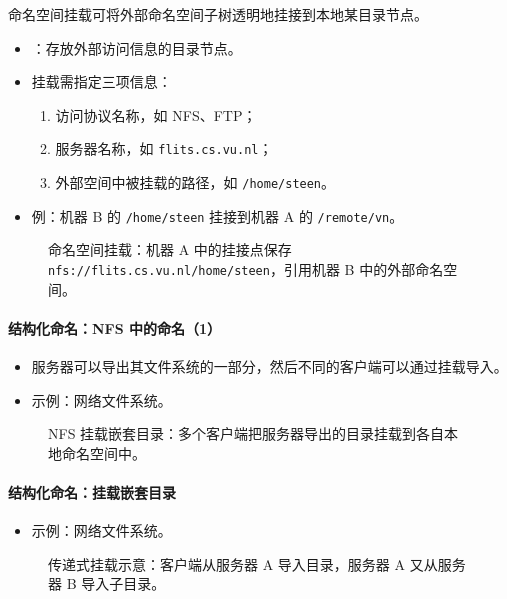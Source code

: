 命名空间挂载可将外部命名空间子树透明地挂接到本地某目录节点。

\begin{itemize}
  \item {}：存放外部访问信息的目录节点。
  \item 挂载需指定三项信息：
  \begin{enumerate}
    \item 访问协议名称，如 NFS、FTP；
    \item 服务器名称，如 \texttt{flits.cs.vu.nl}；
    \item 外部空间中被挂载的路径，如 \texttt{/home/steen}。
  \end{enumerate}
  \item 例：机器 B 的 \texttt{/home/steen} 挂接到机器 A 的 \texttt{/remote/vn}。
\end{itemize}

\begin{figure}[H]
  \centering
  \caption{命名空间挂载：机器 A 中的挂接点保存 \texttt{nfs://flits.cs.vu.nl/home/steen}，引用机器 B 中的外部命名空间。}
\end{figure}

\paragraph{结构化命名：NFS 中的命名（1）}
\begin{itemize}
  \item 服务器可以导出其文件系统的一部分，然后不同的客户端可以通过挂载导入。
  \item 示例：网络文件系统。
\end{itemize}

\begin{figure}[H]
  \centering
  \caption{NFS 挂载嵌套目录：多个客户端把服务器导出的目录挂载到各自本地命名空间中。}
\end{figure}

\paragraph{结构化命名：挂载嵌套目录}
\begin{itemize}
  \item 示例：网络文件系统。
\end{itemize}

\begin{figure}[H]
  \centering
  \caption{传递式挂载示意：客户端从服务器 A 导入目录，服务器 A 又从服务器 B 导入子目录。}
\end{figure}

